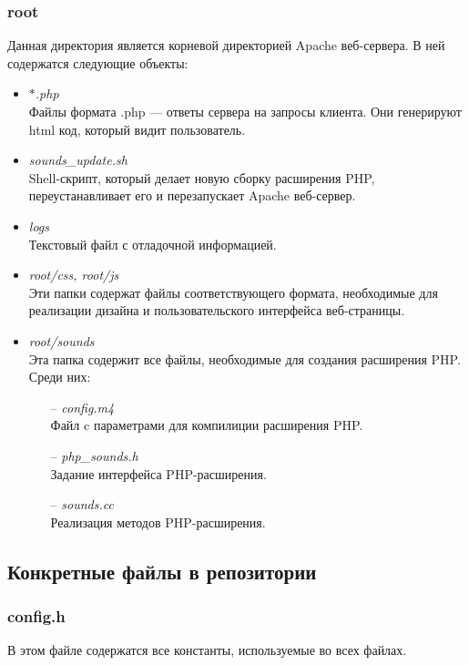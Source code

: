 \documentclass[14pt,a4paper]{article}
\begin{document}
\subsubsection*{root}

Данная директория является корневой директорией Apache веб-сервера. В ней содержатся следующие объекты:
\begin{itemize}
\item \textit{$\ast$.php} \\
Файлы формата .php --- ответы сервера на запросы клиента. Они генерируют html код, который видит пользователь.
\item \textit{sounds\_update.sh} \\
Shell-скрипт, который делает новую сборку расширения PHP, переустанавливает его и перезапускает Apache веб-сервер.
\item \textit{logs} \\
Текстовый файл с отладочной информацией.
\item \textit{root/css, root/js} \\
Эти папки содержат файлы соответствующего формата, необходимые для реализации дизайна и пользовательского интерфейса веб-страницы.
\item \textit{root/sounds} \\
Эта папка содержит все файлы, необходимые для создания расширения PHP. Среди них:
    \begin{itemize}
    \item[--] \textit{config.m4} \\
    Файл c параметрами для компилиции расширения PHP.
    \item[--] \textit{php\_sounds.h} \\
    Задание интерфейса PHP-расширения.
    \item[--] \textit{sounds.cc} \\
    Реализация методов PHP-расширения.
    \end{itemize}
\end{itemize}

\subsection{Конкретные файлы в репозитории}

\subsubsection*{config.h}

В этом файле содержатся все константы, используемые во всех файлах.
\end{document}
